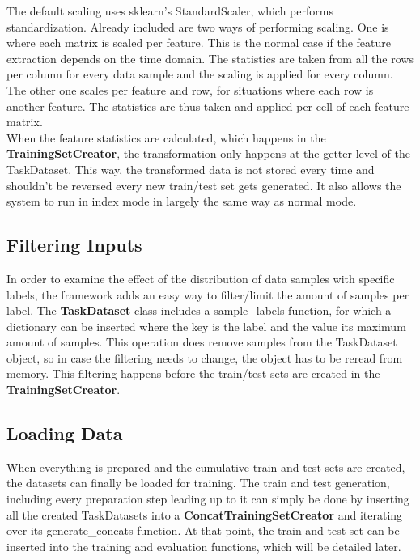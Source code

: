 The default scaling uses sklearn's StandardScaler, which performs standardization. Already included are two ways of performing scaling. One is where each matrix is scaled per feature. This is the normal case if the feature extraction depends on the time domain. The statistics are taken from all the rows per column for every data sample and the scaling is applied for every column. The other one scales per feature and row, for situations where each row is another feature. The statistics are thus taken and applied per cell of each feature matrix. \\

When the feature statistics are calculated, which happens in the \textbf{TrainingSetCreator}, the transformation only happens at the getter level of the TaskDataset. This way, the transformed data is not stored every time and shouldn't be reversed every new train/test set gets generated. It also allows the system to run in index mode in largely the same way as normal mode. \\

\subsection{Filtering Inputs} \label{Impl:DataLoad:Filter}

In order to examine the effect of the distribution of data samples with specific labels, the framework adds an easy way to filter/limit the amount of samples per label. The \textbf{TaskDataset} class includes a sample\_labels function, for which a dictionary can be inserted where the key is the label and the value its maximum amount of samples. This operation does remove samples from the TaskDataset object, so in case the filtering needs to change, the object has to be reread from memory. This filtering happens before the train/test sets are created in the \textbf{TrainingSetCreator}. \\


\subsection{Loading Data} \label{Impl:DataLoad:Load}

When everything is prepared and the cumulative train and test sets are created, the datasets can finally be loaded for training. The train and test generation, including every preparation step leading up to it can simply be done by inserting all the created TaskDatasets into a \textbf{ConcatTrainingSetCreator} and iterating over its generate\_concats function. At that point, the train and test set can be inserted into the training and evaluation functions, which will be detailed later. \\

